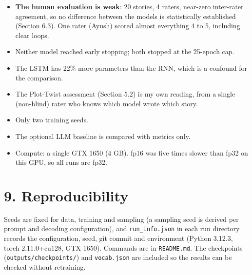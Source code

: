 \documentclass[10pt,a4paper]{article}
\providecommand{\tightlist}{\setlength{\itemsep}{0pt}\setlength{\parskip}{0pt}}
\begin{document}
\begin{itemize}
\tightlist
\item
  \textbf{The human evaluation is weak}: 20 stories, 4 raters, near-zero inter-rater agreement, so no difference between the models is statistically established (Section 6.3). One rater (Ayush) scored almost everything 4 to 5, including clear loops.
\item
  Neither model reached early stopping; both stopped at the 25-epoch cap.
\item
  The LSTM has 22\% more parameters than the RNN, which is a confound for the comparison.
\item
  The Plot-Twist assessment (Section 5.2) is my own reading, from a single (non-blind) rater who knows which model wrote which story.
\item
  Only two training seeds.
\item
  The optional LLM baseline is compared with metrics only.
\item
  Compute: a single GTX 1650 (4 GB). fp16 was five times slower than fp32 on this GPU, so all runs are fp32.
\end{itemize}

\hypertarget{reproducibility}{%
\section{9. Reproducibility}\label{reproducibility}}

Seeds are fixed for data, training and sampling (a sampling seed is derived per prompt and decoding configuration), and \texttt{run\_info.json} in each run directory
records the configuration, seed, git commit and environment (Python 3.12.3, torch 2.11.0+cu128, GTX 1650). Commands are in \texttt{README.md}. The
checkpoints (\texttt{outputs/checkpoints/}) and \texttt{vocab.json} are included so the results can be checked without retraining.
\end{document}

